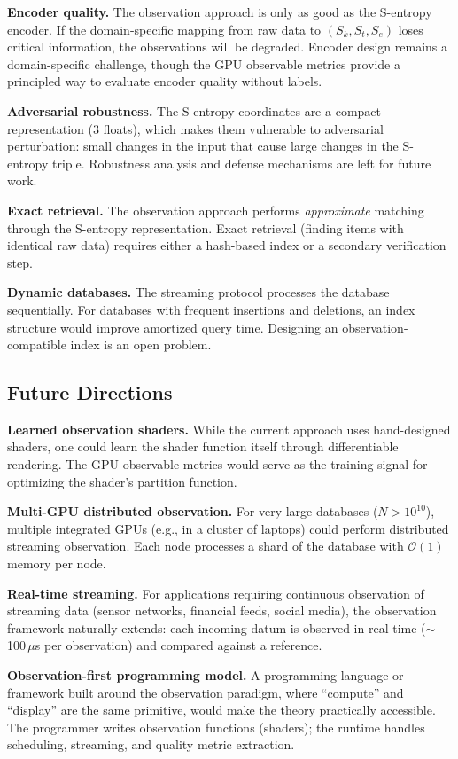 \documentclass[11pt,twocolumn,a4paper]{article}
\newcommand{\Sk}{S_k}
\newcommand{\St}{S_t}
\newcommand{\Se}{S_e}
\newcommand{\BigO}{\mathcal{O}}
\begin{document}
\textbf{Encoder quality.} The observation approach is only as good as
the S-entropy encoder. If the domain-specific mapping from raw data
to $(\Sk, \St, \Se)$ loses critical information, the observations
will be degraded. Encoder design remains a domain-specific challenge,
though the GPU observable metrics provide a principled way to evaluate
encoder quality without labels.

\textbf{Adversarial robustness.} The S-entropy coordinates are a
compact representation (3 floats), which makes them vulnerable to
adversarial perturbation: small changes in the input that cause
large changes in the S-entropy triple. Robustness analysis and
defense mechanisms are left for future work.

\textbf{Exact retrieval.} The observation approach performs
\emph{approximate} matching through the S-entropy representation.
Exact retrieval (finding items with identical raw data) requires
either a hash-based index or a secondary verification step.

\textbf{Dynamic databases.} The streaming protocol processes the
database sequentially. For databases with frequent insertions and
deletions, an index structure would improve amortized query time.
Designing an observation-compatible index is an open problem.

\subsection{Future Directions}

\textbf{Learned observation shaders.} While the current approach uses
hand-designed shaders, one could learn the shader function itself
through differentiable rendering. The GPU observable metrics would
serve as the training signal for optimizing the shader's partition
function.

\textbf{Multi-GPU distributed observation.} For very large databases
($N > 10^{10}$), multiple integrated GPUs (e.g., in a cluster of
laptops) could perform distributed streaming observation. Each node
processes a shard of the database with $\BigO(1)$ memory per node.

\textbf{Real-time streaming.} For applications requiring continuous
observation of streaming data (sensor networks, financial feeds,
social media), the observation framework naturally extends: each
incoming datum is observed in real time ($\sim$100\,$\mu$s per
observation) and compared against a reference.

\textbf{Observation-first programming model.} A programming language
or framework built around the observation paradigm, where ``compute''
and ``display'' are the same primitive, would make the theory
practically accessible. The programmer writes observation functions
(shaders); the runtime handles scheduling, streaming, and quality
metric extraction.
\end{document}
